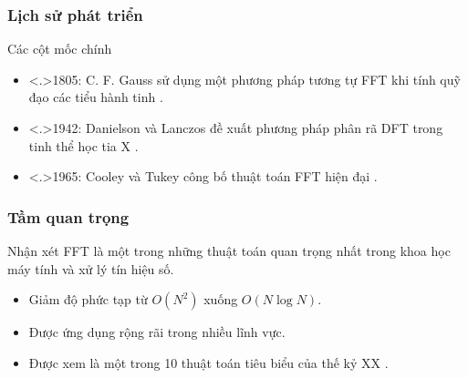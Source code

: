 \begin{frame}
  \frametitle{Lịch sử phát triển}

  \begin{block}{Các cột mốc chính}
    \begin{itemize}[<+->]
      \item \alert<.>{1805}: C. F. Gauss sử dụng một phương pháp tương tự FFT
        khi tính quỹ đạo các tiểu hành tinh \cite{heideman1984gauss}.

      \item \alert<.>{1942}: Danielson và Lanczos đề xuất phương pháp phân rã
        DFT trong tinh thể học tia X \cite{danielson1942}.

      \item \alert<.>{1965}: Cooley và Tukey công bố thuật toán FFT hiện đại
        \cite{cooley1965algorithm}.
    \end{itemize}
  \end{block}
\end{frame}

\begin{frame}
  \frametitle{Tầm quan trọng}

  \begin{block}{Nhận xét}
    FFT là một trong những thuật toán quan trọng nhất trong khoa học máy tính
    và xử lý tín hiệu số.
  \end{block}

  \onslide<+->
  \begin{itemize}[<+->]
    \item Giảm độ phức tạp từ $O(N^2)$ xuống $O(N\log N)$.
    \item Được ứng dụng rộng rãi trong nhiều lĩnh vực.
    \item Được xem là một trong 10 thuật toán tiêu biểu của thế kỷ XX
      \cite{10.1109/MCISE.2000.814652}.
  \end{itemize}
\end{frame}
